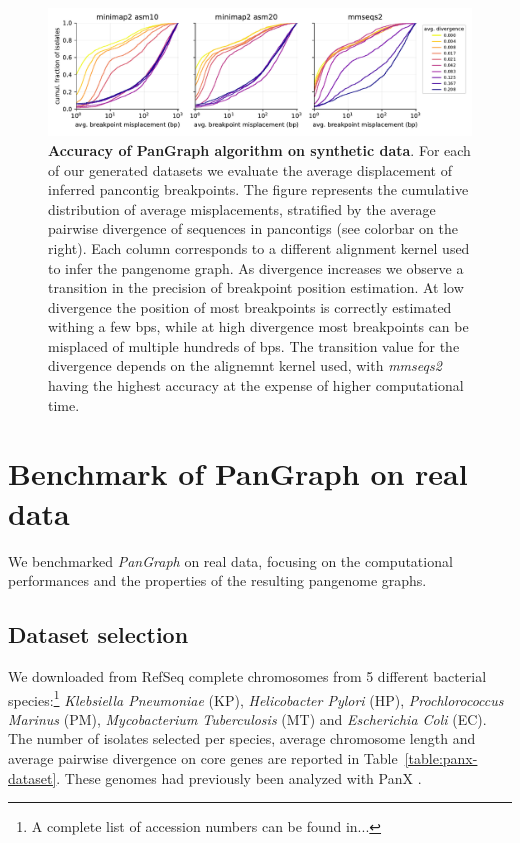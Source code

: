 \documentclass[aps,rmp,reprint,superscriptaddress,notitlepage,10pt,onecolumn]{revtex4-1}
\begin{document}
\begin{figure}[htb]
    \includegraphics[width=\textwidth]{figs_suppl/accuracy_comparison.pdf}
    \caption{{\bf Accuracy of PanGraph algorithm on synthetic data}. For each of our generated datasets we evaluate the average displacement of inferred pancontig breakpoints. The figure represents the cumulative distribution of average misplacements, stratified by the average pairwise divergence of sequences in pancontigs (see colorbar on the right). Each column corresponds to a different alignment kernel used to infer the pangenome graph. As divergence increases we observe a transition in the precision of breakpoint position estimation. At low divergence the position of most breakpoints is correctly estimated withing a few bps, while at high divergence most breakpoints can be misplaced of multiple hundreds of bps. The transition value for the divergence depends on the alignemnt kernel used, with \textit{mmseqs2} having the highest accuracy at the expense of higher computational time.}
    \label{fig:benchmark-accuracy-suppl}
\end{figure}

\section{Benchmark of PanGraph on real data}

We benchmarked \textit{PanGraph} on real data, focusing on the computational performances and the properties of the resulting pangenome graphs.

\subsection{Dataset selection}

We downloaded from RefSeq \cite{o2016reference} complete chromosomes from 5 different bacterial species:\footnote{A complete list of accession numbers can be found in...} \textit{Klebsiella Pneumoniae} (KP), \textit{Helicobacter Pylori} (HP), \textit{Prochlorococcus Marinus} (PM), \textit{Mycobacterium Tuberculosis} (MT) and \textit{Escherichia Coli} (EC). The number of isolates selected per species, average chromosome length and average pairwise divergence on core genes are reported in Table~\ref{table:panx-dataset}. These genomes had previously been analyzed with PanX \cite{ding2018panx}.
\end{document}
